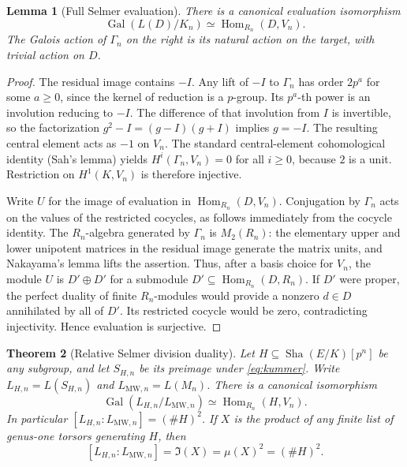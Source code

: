 \documentclass[11pt,a4paper]{article}
\newtheorem{theorem}{Theorem}[section]
\newtheorem{lemma}[theorem]{Lemma}
\theoremstyle{definition}\newtheorem{definition}[theorem]{Definition}
\theoremstyle{remark}\newtheorem{remark}[theorem]{Remark}
\newcommand{\Sha}{\operatorname{\mathrm{Sha}}}
\newcommand{\Gal}{\operatorname{Gal}}\newcommand{\Hom}{\operatorname{Hom}}\newcommand{\End}{\operatorname{End}}\newcommand{\Pic}{\operatorname{Pic}}\newcommand{\NS}{\operatorname{NS}}\newcommand{\Br}{\operatorname{Br}}\newcommand{\Sel}{\operatorname{Sel}}\newcommand{\ord}{\operatorname{ord}}\newcommand{\rk}{\operatorname{rank}}\newcommand{\corank}{\operatorname{corank}}\newcommand{\length}{\operatorname{length}}\newcommand{\Sym}{\operatorname{Sym}}\newcommand{\Cl}{\operatorname{Cl}}\newcommand{\coker}{\operatorname{coker}}\newcommand{\I}{\mathfrak I}\newcommand{\D}{\mathfrak D}\newcommand{\Tdef}{\mathfrak T}
\numberwithin{equation}{section}
\begin{document}
\begin{lemma}[Full Selmer evaluation]\label{lem:eval}
There is a canonical evaluation isomorphism
\begin{equation}\label{eq:eval}
\Gal(L(D)/K_n)\simeq\Hom_{R_n}(D,V_n).
\end{equation}
The Galois action of $\Gamma_n$ on the right is its natural action on the target, with trivial action on $D$.
\end{lemma}
\begin{proof}
The residual image contains $-I$. Any lift of $-I$ to $\Gamma_n$ has order $2p^a$ for some $a\geq0$, since the kernel of reduction is a $p$-group. Its $p^a$-th power is an involution reducing to $-I$. The difference of that involution from $I$ is invertible, so the factorization $g^2-I=(g-I)(g+I)$ implies $g=-I$. The resulting central element acts as $-1$ on $V_n$. The standard central-element cohomological identity (Sah's lemma) yields $H^i(\Gamma_n,V_n)=0$ for all $i\geq0$, because $2$ is a unit. Restriction on $H^1(K,V_n)$ is therefore injective.

Write $U$ for the image of evaluation in $\Hom_{R_n}(D,V_n)$. Conjugation by $\Gamma_n$ acts on the values of the restricted cocycles, as follows immediately from the cocycle identity. The $R_n$-algebra generated by $\Gamma_n$ is $M_2(R_n)$: the elementary upper and lower unipotent matrices in the residual image generate the matrix units, and Nakayama's lemma lifts the assertion. Thus, after a basis choice for $V_n$, the module $U$ is $D'\oplus D'$ for a submodule $D'\subseteq\Hom_{R_n}(D,R_n)$. If $D'$ were proper, the perfect duality of finite $R_n$-modules would provide a nonzero $d\in D$ annihilated by all of $D'$. Its restricted cocycle would be zero, contradicting injectivity. Hence evaluation is surjective.
\end{proof}
\begin{theorem}[Relative Selmer division duality]\label{thm:bridge}
Let $H\subseteq\Sha(E/K)[p^n]$ be any subgroup, and let $S_{H,n}$ be its preimage under \eqref{eq:kummer}. Write $L_{H,n}=L(S_{H,n})$ and $L_{\mathrm{MW},n}=L(M_n)$. There is a canonical isomorphism
\begin{equation}\label{eq:bridge}
\Gal(L_{H,n}/L_{\mathrm{MW},n})\simeq\Hom_{R_n}(H,V_n).
\end{equation}
In particular $[L_{H,n}:L_{\mathrm{MW},n}]=(\#H)^2$. If $X$ is the product of any finite list of genus-one torsors generating $H$, then
\begin{equation}\label{eq:triple}
\boxed{[L_{H,n}:L_{\mathrm{MW},n}]=\I(X)=\mu(X)^2=(\#H)^2.}
\end{equation}
\end{theorem}
\end{document}

